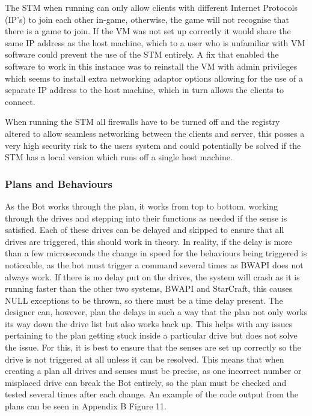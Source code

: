 \documentclass[journal]{IEEEtran}
\begin{document}
	The STM when running can only allow clients with different Internet Protocols (IP's) to join each other in-game, otherwise, the game will not recognise that there is a game to join. If the VM was not set up correctly it would share the same IP address as the host machine, which to a user who is unfamiliar with VM software could prevent the use of the STM entirely. A fix that enabled the software to work in this instance was to reinstall the VM with admin privileges which seems to install extra networking adaptor options allowing for the use of a separate IP address to the host machine, which in turn allows the clients to connect.
	
	When running the STM all firewalls have to be turned off and the registry altered to allow seamless networking between the clients and server, this posses a very high security risk to the users system and could potentially be solved if the STM has a local version which runs off a single host machine.
	\newline
	\subsubsection{Plans and Behaviours}
	As the Bot works through the plan, it works from top to bottom, working through the drives and stepping into their functions as needed if the sense is satisfied. Each of these drives can be delayed and skipped to ensure that all drives are triggered, this should work in theory. In reality, if the delay is more than a few microseconds the change in speed for the behaviours being triggered is noticeable, as the bot must trigger a command several times as BWAPI does not always work. If there is no delay put on the drives, the system will crash as it is running faster than the other two systems, BWAPI and StarCraft, this causes NULL exceptions to be thrown, so there must be a time delay present. The designer can, however, plan the delays in such a way that the plan not only works its way down the drive list but also works back up. This helps with any issues pertaining to the plan getting stuck inside a particular drive but does not solve the issue. For this, it is best to ensure that the senses are set up correctly so the drive is not triggered at all unless it can be resolved. This means that when creating a plan all drives and senses must be precise, as one incorrect number or misplaced drive can break the Bot entirely, so the plan must be checked and tested several times after each change. An example of the code output from the plans can be seen in Appendix B Figure 11.
	
\end{document}
